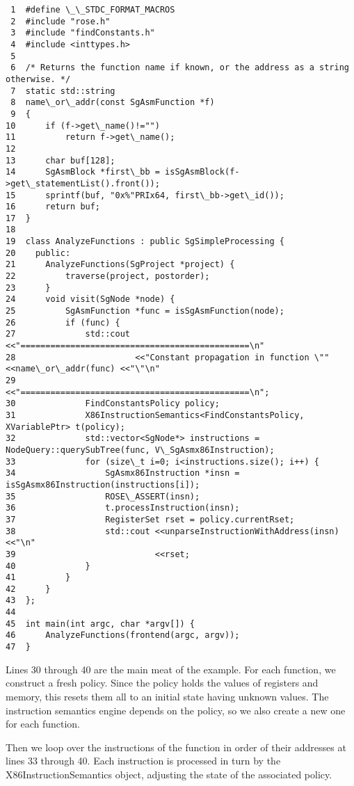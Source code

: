 \begin{verbatim}
 1  #define \_\_STDC_FORMAT_MACROS
 2  #include "rose.h"
 3  #include "findConstants.h"
 4  #include <inttypes.h>
 5
 6  /* Returns the function name if known, or the address as a string otherwise. */
 7  static std::string
 8  name\_or\_addr(const SgAsmFunction *f)
 9  {
10      if (f->get\_name()!="")
11          return f->get\_name();
12  
13      char buf[128];
14      SgAsmBlock *first\_bb = isSgAsmBlock(f->get\_statementList().front());
15      sprintf(buf, "0x%"PRIx64, first\_bb->get\_id());
16      return buf;
17  }
18
19  class AnalyzeFunctions : public SgSimpleProcessing {
20    public:
21      AnalyzeFunctions(SgProject *project) {
22          traverse(project, postorder);
23      }
24      void visit(SgNode *node) {
25          SgAsmFunction *func = isSgAsmFunction(node);
26          if (func) {
27              std::cout <<"==============================================\n"
28                        <<"Constant propagation in function \"" <<name\_or\_addr(func) <<"\"\n"
29                        <<"==============================================\n";
30              FindConstantsPolicy policy;
31              X86InstructionSemantics<FindConstantsPolicy, XVariablePtr> t(policy);
32              std::vector<SgNode*> instructions = NodeQuery::querySubTree(func, V\_SgAsmx86Instruction);
33              for (size\_t i=0; i<instructions.size(); i++) {
34                  SgAsmx86Instruction *insn = isSgAsmx86Instruction(instructions[i]);
35                  ROSE\_ASSERT(insn);
36                  t.processInstruction(insn);
37                  RegisterSet rset = policy.currentRset;
38                  std::cout <<unparseInstructionWithAddress(insn) <<"\n"
39                            <<rset;
40              }
41          }
42      }
43  };
44
45  int main(int argc, char *argv[]) {
46      AnalyzeFunctions(frontend(argc, argv));
47  }
\end{verbatim}

Lines 30 through 40 are the main meat of the example. For each
function, we construct a fresh policy. Since the policy holds the
values of registers and memory, this resets them all to an initial
state having unknown values.  The instruction semantics engine depends
on the policy, so we also create a new one for each function.

Then we loop over the instructions of the function in order of their
addresses at lines 33 through 40.  Each instruction is processed in
turn by the X86InstructionSemantics object, adjusting the state of the
associated policy.

